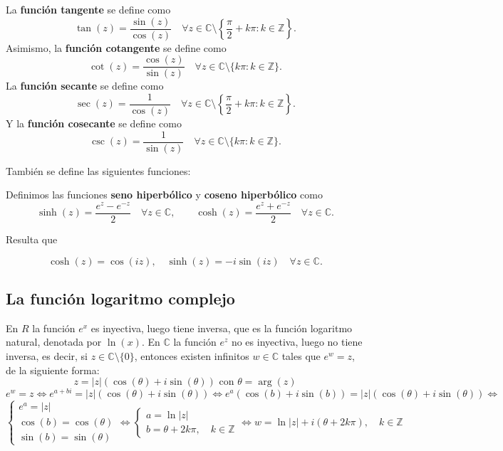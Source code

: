 \begin{definición}
    La \textbf{función tangente} se define como
    \[
        \tan(z) = \frac{\sin(z)}{\cos(z)} \quad \forall z \in \mathbb{C} \setminus \left\{\frac{\pi}{2} + k\pi : k \in \mathbb{Z}\right\}.
    \]
    Asimismo, la \textbf{función cotangente} se define como
    \[
        \cot(z) = \frac{\cos(z)}{\sin(z)} \quad \forall z \in \mathbb{C} \setminus \{k\pi : k \in \mathbb{Z}\}.
    \]
    La \textbf{función secante} se define como
    \[
        \sec(z) = \frac{1}{\cos(z)} \quad \forall z \in \mathbb{C} \setminus \left\{\frac{\pi}{2} + k\pi : k \in \mathbb{Z}\right\}.
    \]
    Y la \textbf{función cosecante} se define como
    \[
        \csc(z) = \frac{1}{\sin(z)} \quad \forall z \in \mathbb{C} \setminus \{k\pi : k \in \mathbb{Z}\}.
    \]
\end{definición}

También se define las siguientes funciones:
\begin{definición}
    Definimos las funciones \textbf{seno hiperbólico} y \textbf{coseno hiperbólico} como
    \[
        \sinh(z) = \frac{e^z - e^{-z}}{2} \quad \forall z \in \mathbb{C}, \qquad \cosh(z) = \frac{e^z + e^{-z}}{2} \quad \forall z \in \mathbb{C}.
    \]
\end{definición}

Resulta que 

\[
    \cosh(z) = \cos(iz), \quad \sinh(z) = -i\sin(iz) \quad \forall z \in \mathbb{C}.
\]

\subsection{La función logaritmo complejo}

En $R$ la función $e^x$ es inyectiva, luego tiene inversa, que es la función logaritmo natural, denotada por $\ln(x)$. En $\mathbb{C}$ la función $e^z$ no es inyectiva, luego no tiene inversa, es decir, si $z \in \mathbb{C} \setminus \{0\}$, entonces existen infinitos $w \in \mathbb{C}$ tales que $e^w = z$, de la siguiente forma:
\[
z = |z|(\cos(\theta) + i\sin(\theta)) \text{ con } \theta = \arg(z)
\]
\[
e^w = z \iff e^{a+bi} = |z|(\cos(\theta) + i\sin(\theta)) \iff e^a(\cos(b) + i\sin(b)) = |z|(\cos(\theta) + i\sin(\theta)) \iff
\]
\[
\begin{cases}
e^a = |z| \\
\cos(b) = \cos(\theta) \\
\sin(b) = \sin(\theta)
\end{cases} \iff \begin{cases}
a = \ln|z| \\
b = \theta + 2k\pi, \quad k \in \mathbb{Z}
\end{cases}
\iff
w = \ln|z| + i(\theta + 2k\pi), \quad k \in \mathbb{Z}
\]

